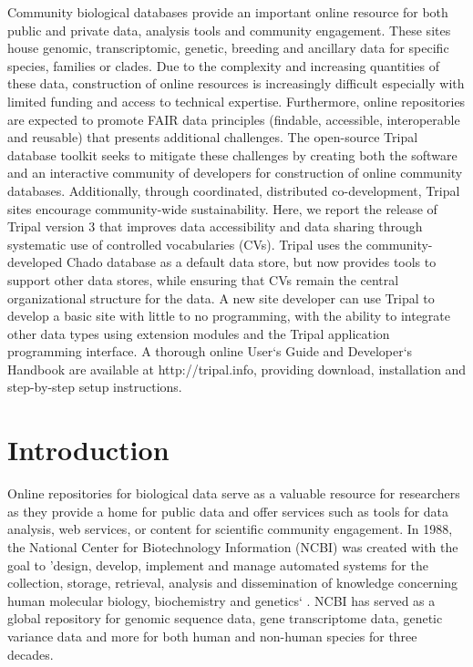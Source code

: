 Community biological databases provide an important online resource for both public and private data, analysis tools and community engagement. These sites house genomic, transcriptomic, genetic, breeding and ancillary data for specific species, families or clades. Due to the complexity and increasing quantities of these data, construction of online resources is increasingly difficult especially with limited funding and access to technical expertise. Furthermore, online repositories are expected to promote FAIR data principles (findable, accessible, interoperable and reusable) that presents additional challenges. The open-source Tripal database toolkit seeks to mitigate these challenges by creating both the software and an interactive community of developers for construction of online community databases. Additionally, through coordinated, distributed co-development, Tripal sites encourage community-wide sustainability. Here, we report the release of Tripal version 3 that improves data accessibility and data sharing through systematic use of controlled vocabularies (CVs). Tripal uses the community-developed Chado database as a default data store, but now provides tools to support other data stores, while ensuring that CVs remain the central organizational structure for the data. A new site developer can use Tripal to develop a basic site with little to no programming, with the ability to integrate other data types using extension modules and the Tripal application programming interface. A thorough online User`s Guide and Developer`s Handbook are available at http://tripal.info, providing download, installation and step-by-step setup instructions.


\section*{Introduction}


Online repositories for biological data serve as a valuable resource for researchers as they provide a home for public data and offer services such as tools for data analysis, web services, or content for scientific community engagement. In 1988, the National Center for Biotechnology Information (NCBI) was created with the goal to 'design, develop, implement and manage automated systems for the collection, storage, retrieval, analysis and dissemination of knowledge concerning human molecular biology, biochemistry and genetics` \cite{usc42}. NCBI has served as a global repository for genomic sequence data, gene transcriptome data, genetic variance data and more for both human and non-human species for three decades.

